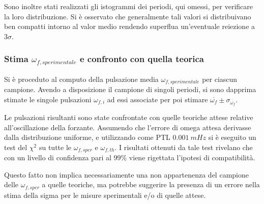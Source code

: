 \documentclass[a4paper,11pt,oneside]{article}
\begin{document}
Sono inoltre stati realizzati gli istogrammi dei periodi, qui omessi, per verificare la loro distribuzione. Si è osservato che generalmente tali valori si distribuivano ben compatti intorno al valor medio rendendo superflua un'eventuale reiezione a $3 \sigma$.

\subsubsection{Stima $\omega_{f, sperimentale}$ e confronto con quella teorica}
Si è proceduto al computo della pulsazione media $\omega_{f, sperimentale}$ per ciascun campione. Avendo a disposizione il campione di singoli periodi, si sono dapprima stimate le singole pulsazioni $\omega_{f, i}$ ad essi associate per poi stimare $\overline{\omega_{f}}\pm \sigma_{\overline{\omega_{f}}}$.

Le pulsazioni risultanti sono state confrontate con quelle teoriche attese relative all'oscillazione della forzante. Assumendo che l'errore di omega attesa derivasse dalla distribuzione uniforme, e utilizzando come PTL $\SI{0.001}{mHz}$  si è eseguito un test del $\chi^{2}$ su tutte le $\omega_{f, sper}$ e $\omega_{f, th}$.
I risultati ottenuti da tale test rivelano che con un livello di confidenza pari al $99\%$ viene rigettata l'ipotesi di compatibilità.


Questo fatto non implica necessariamente una non appartenenza del campione delle $\omega_{f, sper}$ a quelle teoriche, ma potrebbe suggerire la presenza di un errore nella stima della sigma per le misure sperimentali e/o di quelle attese.
\end{document}
